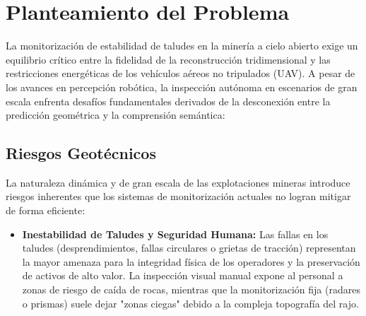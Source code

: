 \documentclass[12pt,a4paper]{article}
\begin{document}
	\section{Planteamiento del Problema}
	
	La monitorización de estabilidad de taludes en la minería a cielo abierto exige un equilibrio crítico entre la fidelidad de la reconstrucción tridimensional y las restricciones energéticas de los vehículos aéreos no tripulados (UAV). A pesar de los avances en percepción robótica, la inspección autónoma en escenarios de gran escala enfrenta desafíos fundamentales derivados de la desconexión entre la predicción geométrica y la comprensión semántica:
	
	\subsection{Riesgos Geotécnicos}
	
	La naturaleza dinámica y de gran escala de las explotaciones mineras introduce riesgos inherentes que los sistemas de monitorización actuales no logran mitigar de forma eficiente:
	
	\begin{itemize}
		\item \textbf{Inestabilidad de Taludes y Seguridad Humana:} Las fallas en los taludes (desprendimientos, fallas circulares o grietas de tracción) representan la mayor amenaza para la integridad física de los operadores y la preservación de activos de alto valor. La inspección visual manual expone al personal a zonas de riesgo de caída de rocas, mientras que la monitorización fija (radares o prismas) suele dejar "zonas ciegas" debido a la compleja topografía del rajo.
	\end{itemize}
	
	
\end{document}
